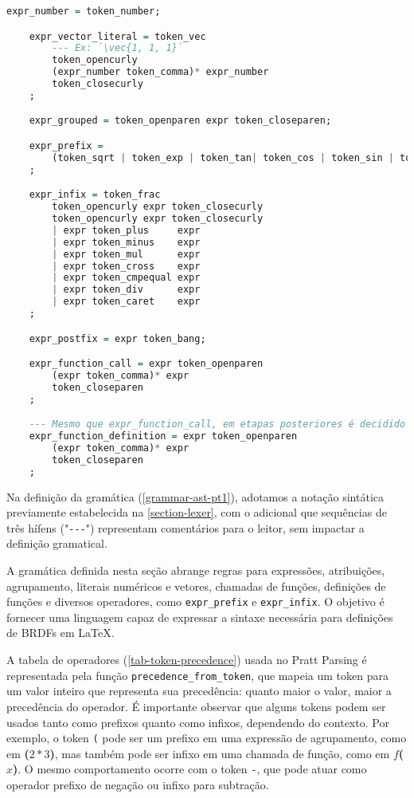 \begin{codigo}[H]
        \caption{\small Gramática para \texttt{EquantionLang} parte 2.}
        \label{grammar-ast-pt2}
\begin{lstlisting}[language=haskell, numbers=none, inputencoding=utf8]
    expr_number = token_number;

    expr_vector_literal = token_vec
        --- Ex: `\vec{1, 1, 1}`
        token_opencurly
        (expr_number token_comma)* expr_number
        token_closecurly
    ;

    expr_grouped = token_openparen expr token_closeparen;

    expr_prefix =
        (token_sqrt | token_exp | token_tan| token_cos | token_sin | token_arctan | token_arccos | token_arcsin | token_minus | token_plus) expr
    ;

    expr_infix = token_frac
        token_opencurly expr token_closecurly
        token_opencurly expr token_closecurly
        | expr token_plus     expr
        | expr token_minus    expr
        | expr token_mul      expr
        | expr token_cross    expr
        | expr token_cmpequal expr
        | expr token_div      expr
        | expr token_caret    expr
    ;

    expr_postfix = expr token_bang;

    expr_function_call = expr token_openparen
        (expr token_comma)* expr
        token_closeparen
    ;

    --- Mesmo que expr_function_call, em etapas posteriores é decidido qual tipo realmente é.
    expr_function_definition = expr token_openparen
        (expr token_comma)* expr
        token_closeparen
    ;
\end{lstlisting}
\end{codigo}

Na definição da gramática (\autoref{grammar-ast-pt1}), adotamos a notação sintática previamente estabelecida na \autoref{section-lexer}, com o adicional que sequências de três hífens ("\verb"---"") representam comentários para o leitor, sem impactar a definição gramatical.

A gramática definida nesta seção abrange regras para expressões, atribuições, agrupamento, literais numéricos e vetores, chamadas de funções, definições de funções e diversos operadores, como \texttt{expr\_prefix} e \texttt{expr\_infix}. O objetivo é fornecer uma linguagem capaz de expressar a sintaxe necessária para definições de BRDFs em \LaTeX{}. 

A tabela de operadores (\autoref{tab-token-precedence}) usada no Pratt Parsing é representada pela função \texttt{precedence\_from\_token}, que mapeia um token para um valor inteiro que representa sua precedência: quanto maior o valor, maior a precedência do operador. É importante observar que alguns tokens podem ser usados tanto como prefixos quanto como infixos, dependendo do contexto. Por exemplo, o token \texttt{(} pode ser um prefixo em uma expressão de agrupamento, como em \textbf{(}$2*3$\textbf{)}, mas também pode ser infixo em uma chamada de função, como em $f$\textbf{(}$x$\textbf{)}. O mesmo comportamento ocorre com o token \texttt{-}, que pode atuar como operador prefixo de negação ou infixo para subtração.



